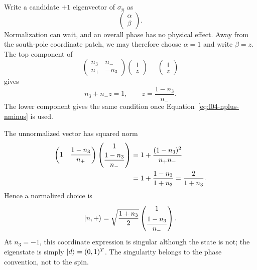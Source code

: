 Write a candidate \(+1\) eigenvector of \(\sigma_{\hat n}\) as
\begin{equation}
  \begin{pmatrix}\alpha\\\beta\end{pmatrix}.
\end{equation}
Normalization can wait, and an overall phase has no physical effect. Away from the south-pole coordinate patch, we may therefore choose \(\alpha=1\) and write \(\beta=z\). The top component of
\begin{equation}
  \begin{pmatrix}
    n_3&n_-\\
    n_+&-n_3
  \end{pmatrix}
  \begin{pmatrix}1\\z\end{pmatrix}
  =
  \begin{pmatrix}1\\z\end{pmatrix}
\end{equation}
gives
\begin{equation}
  n_3+n_-z=1,
  \qquad
  z=\frac{1-n_3}{n_-}.
  \label{eq:l04-z-solution}
\end{equation}
The lower component gives the same condition once Equation~\eqref{eq:l04-nplus-nminus} is used.

The unnormalized vector has squared norm
\begin{align}
  \begin{pmatrix}
    1&\dfrac{1-n_3}{n_+}
  \end{pmatrix}
  \begin{pmatrix}
    1\\[3pt]\dfrac{1-n_3}{n_-}
  \end{pmatrix}
  &=
  1+\frac{(1-n_3)^2}{n_+n_-}
  \notag\\
  &=
  1+\frac{1-n_3}{1+n_3}
  =
  \frac{2}{1+n_3}.
  \label{eq:l04-unnormalized-norm}
\end{align}
Hence a normalized choice is
\begin{equation}
  \left\lvert n,+\right\rangle
  =
  \sqrt{\frac{1+n_3}{2}}
  \begin{pmatrix}
    1\\[5pt]\dfrac{1-n_3}{n_-}
  \end{pmatrix}.
  \label{eq:l04-normalized-n-state}
\end{equation}
At \(n_3=-1\), this coordinate expression is singular although the state is not; the eigenstate is simply \(\left\lvert d\right\rangle=(0,1)^T\). The singularity belongs to the phase convention, not to the spin.

